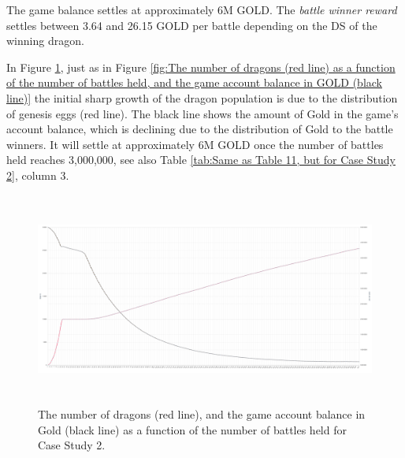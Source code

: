 \documentclass[12pt]{article}
\begin{document}
{The game balance settles at approximately 6M GOLD. The \textit{battle winner reward} settles between 3.64 and 26.15 GOLD per battle depending on the DS of the winning dragon.\par

In Figure \ref{fig:CS2The number of dragons (red line) as a function of the number of battles held, and the game account balance in Gold (black line).}, just as in Figure \ref{fig:The number of dragons (red line) as a function of the number of battles held, and the game account balance in GOLD (black line)} the initial sharp growth of the dragon population is due to the distribution of genesis eggs (red line). The black line shows the amount of Gold in the game’s account balance, which is declining due to the distribution of Gold to the battle winners. It will settle at approximately 6M GOLD once the number of battles held reaches 3,000,000, see also  Table \ref{tab:Same as Table 11, but for Case Study 2}, column 3.\par




\begin{figure}[H]
	\begin{Center}
		\includegraphics[width=6.27in,height=2.76in]{./media/CS2nimage30.png}
		\caption{The number of dragons (red line), and the game account balance in Gold (black line) as a function of the number of battles held for Case Study 2.}
		\label{fig:CS2The number of dragons (red line) as a function of the number of battles held, and the game account balance in Gold (black line).}
	\end{Center}
\end{figure}





}
\end{document}
